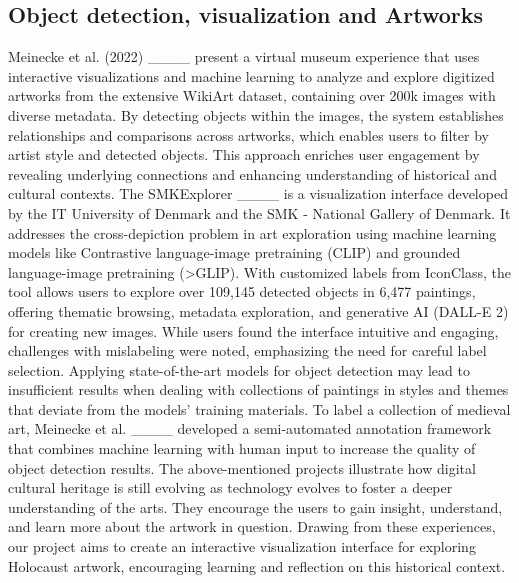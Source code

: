 \subsection{Object detection, visualization and Artworks}
Meinecke et al. (2022) ____  present a virtual museum experience that uses interactive visualizations and machine learning to analyze and explore digitized artworks from the extensive WikiArt dataset, containing over 200k images with diverse metadata. By detecting objects within the images, the system establishes relationships and comparisons across artworks, which enables users to filter by artist style and detected objects. This approach enriches user engagement by revealing underlying connections and enhancing understanding of historical and cultural contexts.
The SMKExplorer ____ is a visualization interface developed by the IT University of Denmark and the SMK - National Gallery of Denmark. It addresses the cross-depiction problem in art exploration using machine learning models like Contrastive language-image pretraining (CLIP) and grounded language-image pretraining (>GLIP). With customized labels from IconClass, the tool allows users to explore over 109,145 detected objects in 6,477 paintings, offering thematic browsing, metadata exploration, and generative AI (DALL-E 2) for creating new images. While users found the interface intuitive and engaging, challenges with mislabeling were noted, emphasizing the need for careful label selection.
Applying state-of-the-art models for object detection may lead to insufficient results when dealing with collections of paintings in styles and themes that deviate from the models’ training materials. To label a collection of medieval art, Meinecke et al. ____ developed a semi-automated annotation framework that combines machine learning with human input to increase the quality of object detection results.
The above-mentioned projects illustrate how digital cultural heritage is still evolving as technology evolves to foster a deeper understanding of the arts. They encourage the users to gain insight, understand, and learn more about the artwork in question. Drawing from these experiences, our project aims to create an interactive visualization interface for exploring Holocaust artwork, encouraging learning and reflection on this historical context.